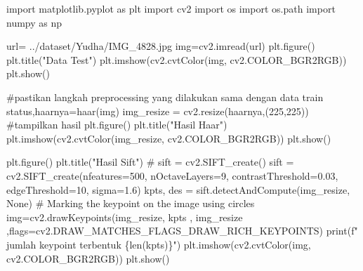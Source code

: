 \documentclass[
  letterpaper,
  DIV=11,
  numbers=noendperiod]{scrreprt}
\newenvironment{Shaded}{\begin{snugshade}}{\end{snugshade}}
\newcommand{\BuiltInTok}[1]{\textcolor[rgb]{0.00,0.23,0.31}{#1}}
\newcommand{\CommentTok}[1]{\textcolor[rgb]{0.37,0.37,0.37}{#1}}
\newcommand{\DecValTok}[1]{\textcolor[rgb]{0.68,0.00,0.00}{#1}}
\newcommand{\FloatTok}[1]{\textcolor[rgb]{0.68,0.00,0.00}{#1}}
\newcommand{\ImportTok}[1]{\textcolor[rgb]{0.00,0.46,0.62}{#1}}
\newcommand{\NormalTok}[1]{\textcolor[rgb]{0.00,0.23,0.31}{#1}}
\newcommand{\OperatorTok}[1]{\textcolor[rgb]{0.37,0.37,0.37}{#1}}
\newcommand{\SpecialCharTok}[1]{\textcolor[rgb]{0.37,0.37,0.37}{#1}}
\newcommand{\SpecialStringTok}[1]{\textcolor[rgb]{0.13,0.47,0.30}{#1}}
\newcommand{\StringTok}[1]{\textcolor[rgb]{0.13,0.47,0.30}{#1}}
\newcommand{\VariableTok}[1]{\textcolor[rgb]{0.07,0.07,0.07}{#1}}
\begin{document}
\begin{Shaded}
\begin{Highlighting}[]
\ImportTok{import}\NormalTok{ matplotlib.pyplot }\ImportTok{as}\NormalTok{ plt}
\ImportTok{import}\NormalTok{ cv2}
\ImportTok{import}\NormalTok{ os}
\ImportTok{import}\NormalTok{ os.path}
\ImportTok{import}\NormalTok{ numpy }\ImportTok{as}\NormalTok{ np  }

\NormalTok{url}\OperatorTok{=} \StringTok{\textquotesingle{}../dataset/Yudha/IMG\_4828.jpg\textquotesingle{}}
\NormalTok{img}\OperatorTok{=}\NormalTok{cv2.imread(url)}
\NormalTok{plt.figure()}
\NormalTok{plt.title(}\StringTok{"Data Test"}\NormalTok{)}
\NormalTok{plt.imshow(cv2.cvtColor(img, cv2.COLOR\_BGR2RGB))}
\NormalTok{plt.show()}

\CommentTok{\#pastikan langkah preprocessing yang dilakukan sama dengan data train}
\NormalTok{status,haarnya}\OperatorTok{=}\NormalTok{haar(img)}
\NormalTok{img\_resize }\OperatorTok{=}\NormalTok{ cv2.resize(haarnya,(}\DecValTok{225}\NormalTok{,}\DecValTok{225}\NormalTok{))}
\CommentTok{\#tampilkan hasil}
\NormalTok{plt.figure()}
\NormalTok{plt.title(}\StringTok{"Hasil Haar"}\NormalTok{)}
\NormalTok{plt.imshow(cv2.cvtColor(img\_resize, cv2.COLOR\_BGR2RGB))}
\NormalTok{plt.show()}


\NormalTok{plt.figure()}
\NormalTok{plt.title(}\StringTok{"Hasil Sift"}\NormalTok{)}
\CommentTok{\# sift = cv2.SIFT\_create()}
\NormalTok{sift }\OperatorTok{=}\NormalTok{ cv2.SIFT\_create(nfeatures}\OperatorTok{=}\DecValTok{500}\NormalTok{, nOctaveLayers}\OperatorTok{=}\DecValTok{9}\NormalTok{, contrastThreshold}\OperatorTok{=}\FloatTok{0.03}\NormalTok{, edgeThreshold}\OperatorTok{=}\DecValTok{10}\NormalTok{, sigma}\OperatorTok{=}\FloatTok{1.6}\NormalTok{)}
\NormalTok{kpts, des }\OperatorTok{=}\NormalTok{ sift.detectAndCompute(img\_resize, }\VariableTok{None}\NormalTok{)}
\CommentTok{\# Marking the keypoint on the image using circles}
\NormalTok{img}\OperatorTok{=}\NormalTok{cv2.drawKeypoints(img\_resize, kpts , img\_resize ,flags}\OperatorTok{=}\NormalTok{cv2.DRAW\_MATCHES\_FLAGS\_DRAW\_RICH\_KEYPOINTS)}
\BuiltInTok{print}\NormalTok{(}\SpecialStringTok{f" jumlah keypoint terbentuk }\SpecialCharTok{\{}\BuiltInTok{len}\NormalTok{(kpts)}\SpecialCharTok{\}}\SpecialStringTok{"}\NormalTok{)}
\NormalTok{plt.imshow(cv2.cvtColor(img, cv2.COLOR\_BGR2RGB))}
\NormalTok{plt.show()}



\end{Highlighting}
\end{Shaded}
\end{document}
